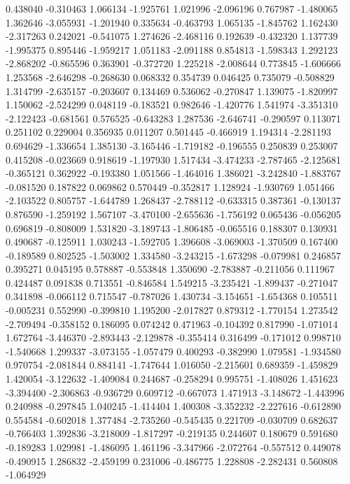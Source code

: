 0.438040
-0.310463
1.066134
-1.925761
1.021996
-2.096196
0.767987
-1.480065
1.362646
-3.055931
-1.201940
0.335634
-0.463793
1.065135
-1.845762
1.162430
-2.317263
0.242021
-0.541075
1.274626
-2.468116
0.192639
-0.432320
1.137739
-1.995375
0.895446
-1.959217
1.051183
-2.091188
0.854813
-1.598343
1.292123
-2.868202
-0.865596
0.363901
-0.372720
1.225218
-2.008644
0.773845
-1.606666
1.253568
-2.646298
-0.268630
0.068332
0.354739
0.046425
0.735079
-0.508829
1.314799
-2.635157
-0.203607
0.134469
0.536062
-0.270847
1.139075
-1.820997
1.150062
-2.524299
0.048119
-0.183521
0.982646
-1.420776
1.541974
-3.351310
-2.122423
-0.681561
0.576525
-0.643283
1.287536
-2.646741
-0.290597
0.113071
0.251102
0.229004
0.356935
0.011207
0.501445
-0.466919
1.194314
-2.281193
0.694629
-1.336654
1.385130
-3.165446
-1.719182
-0.196555
0.250839
0.253007
0.415208
-0.023669
0.918619
-1.197930
1.517434
-3.474233
-2.787465
-2.125681
-0.365121
0.362922
-0.193380
1.051566
-1.464016
1.386021
-3.242840
-1.883767
-0.081520
0.187822
0.069862
0.570449
-0.352817
1.128924
-1.930769
1.051466
-2.103522
0.805757
-1.644789
1.268437
-2.788112
-0.633315
0.387361
-0.130137
0.876590
-1.259192
1.567107
-3.470100
-2.655636
-1.756192
0.065436
-0.056205
0.696819
-0.808009
1.531820
-3.189743
-1.806485
-0.065516
0.188307
0.130931
0.490687
-0.125911
1.030243
-1.592705
1.396608
-3.069003
-1.370509
0.167400
-0.189589
0.802525
-1.503002
1.334580
-3.243215
-1.673298
-0.079981
0.246857
0.395271
0.045195
0.578887
-0.553848
1.350690
-2.783887
-0.211056
0.111967
0.424487
0.091838
0.713551
-0.846584
1.549215
-3.235421
-1.899437
-0.271047
0.341898
-0.066112
0.715547
-0.787026
1.430734
-3.154651
-1.654368
0.105511
-0.005231
0.552990
-0.399810
1.195200
-2.017827
0.879312
-1.770154
1.273542
-2.709494
-0.358152
0.186095
0.074242
0.471963
-0.104392
0.817990
-1.071014
1.672764
-3.446370
-2.893443
-2.129878
-0.355414
0.316499
-0.171012
0.998710
-1.540668
1.299337
-3.073155
-1.057479
0.400293
-0.382990
1.079581
-1.934580
0.970754
-2.081844
0.884141
-1.747644
1.016050
-2.215601
0.689359
-1.459829
1.420054
-3.122632
-1.409084
0.244687
-0.258294
0.995751
-1.408026
1.451623
-3.394400
-2.306863
-0.936729
0.609712
-0.667073
1.471913
-3.148672
-1.443996
0.240988
-0.297845
1.040245
-1.414404
1.400308
-3.352232
-2.227616
-0.612890
0.554584
-0.602018
1.377484
-2.735260
-0.545435
0.221709
-0.030709
0.682637
-0.766403
1.392836
-3.218009
-1.817297
-0.219135
0.244607
0.180679
0.591680
-0.189283
1.029981
-1.486095
1.461196
-3.347966
-2.072764
-0.557512
0.449078
-0.490915
1.286832
-2.459199
0.231006
-0.486775
1.228808
-2.282431
0.560808
-1.064929
